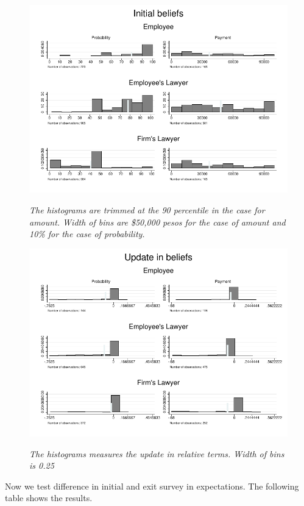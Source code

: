 \documentclass[12pt]{article}
\theoremstyle{named}
\newcommand{\folder}{./Effect}
\begin{document}
\begin{figure}[H]
\label{diff}
\begin{center}
\includegraphics[width=\textwidth]{./Figures/belief.pdf}
\end{center}
{\footnotesize \textit{The histograms are trimmed at the 90 percentile in the case for amount. Width of bins are \$50,000 pesos for the case of amount and 10\% for the case of probability.}}
\end{figure}


\begin{figure}[H]
\label{update}
\begin{center}
\includegraphics[width=\textwidth]{./Figures/update_belief.pdf}
\end{center}
{\footnotesize \textit{The histograms measures the update in relative terms. Width of bins is 0.25 }}
\end{figure}

\pagebreak

Now we test difference in initial and exit survey in expectations. The following table shows the results.

\begin{center}
\scriptsize{}
\end{center}


\end{document}
